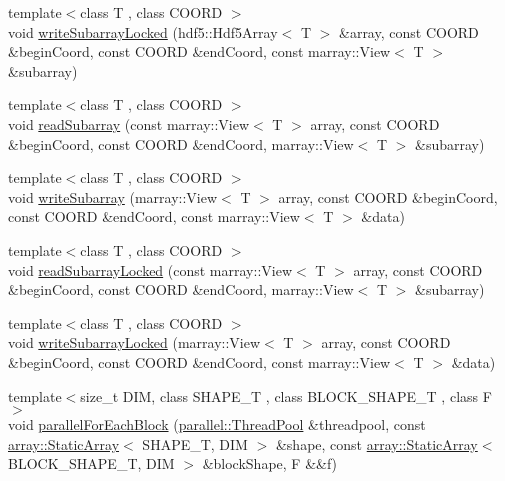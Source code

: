 \begin{DoxyCompactItemize}
{\footnotesize template$<$class T , class C\+O\+O\+R\+D $>$ }\\void \hyperlink{namespacenifty_1_1tools_a102fca55b5880c5b398205f0b438fbfe}{write\+Subarray\+Locked} (hdf5\+::\+Hdf5\+Array$<$ T $>$ \&array, const C\+O\+O\+R\+D \&begin\+Coord, const C\+O\+O\+R\+D \&end\+Coord, const marray\+::\+View$<$ T $>$ \&subarray)
\item 
{\footnotesize template$<$class T , class C\+O\+O\+R\+D $>$ }\\void \hyperlink{namespacenifty_1_1tools_ab1a49786aa1d421ff8801c6659ada142}{read\+Subarray} (const marray\+::\+View$<$ T $>$ array, const C\+O\+O\+R\+D \&begin\+Coord, const C\+O\+O\+R\+D \&end\+Coord, marray\+::\+View$<$ T $>$ \&subarray)
\item 
{\footnotesize template$<$class T , class C\+O\+O\+R\+D $>$ }\\void \hyperlink{namespacenifty_1_1tools_ace36c8be6273f83864c4b1b261eb25d3}{write\+Subarray} (marray\+::\+View$<$ T $>$ array, const C\+O\+O\+R\+D \&begin\+Coord, const C\+O\+O\+R\+D \&end\+Coord, const marray\+::\+View$<$ T $>$ \&data)
\item 
{\footnotesize template$<$class T , class C\+O\+O\+R\+D $>$ }\\void \hyperlink{namespacenifty_1_1tools_ad9c06ed1bf5a27481583971a28bf9142}{read\+Subarray\+Locked} (const marray\+::\+View$<$ T $>$ array, const C\+O\+O\+R\+D \&begin\+Coord, const C\+O\+O\+R\+D \&end\+Coord, marray\+::\+View$<$ T $>$ \&subarray)
\item 
{\footnotesize template$<$class T , class C\+O\+O\+R\+D $>$ }\\void \hyperlink{namespacenifty_1_1tools_a0d4355b32819ca638b88af283797bc92}{write\+Subarray\+Locked} (marray\+::\+View$<$ T $>$ array, const C\+O\+O\+R\+D \&begin\+Coord, const C\+O\+O\+R\+D \&end\+Coord, const marray\+::\+View$<$ T $>$ \&data)
\item 
{\footnotesize template$<$size\+\_\+t D\+I\+M, class S\+H\+A\+P\+E\+\_\+\+T , class B\+L\+O\+C\+K\+\_\+\+S\+H\+A\+P\+E\+\_\+\+T , class F $>$ }\\void \hyperlink{namespacenifty_1_1tools_ac5e8d4b06486a3d603cdbb7314f8dd75}{parallel\+For\+Each\+Block} (\hyperlink{classnifty_1_1parallel_1_1ThreadPool}{parallel\+::\+Thread\+Pool} \&threadpool, const \hyperlink{namespacenifty_1_1array_a683f151f19c851754e0c6d55ed16a0c2}{array\+::\+Static\+Array}$<$ S\+H\+A\+P\+E\+\_\+\+T, D\+I\+M $>$ \&shape, const \hyperlink{namespacenifty_1_1array_a683f151f19c851754e0c6d55ed16a0c2}{array\+::\+Static\+Array}$<$ B\+L\+O\+C\+K\+\_\+\+S\+H\+A\+P\+E\+\_\+\+T, D\+I\+M $>$ \&block\+Shape, F \&\&f)

\end{DoxyCompactItemize}

